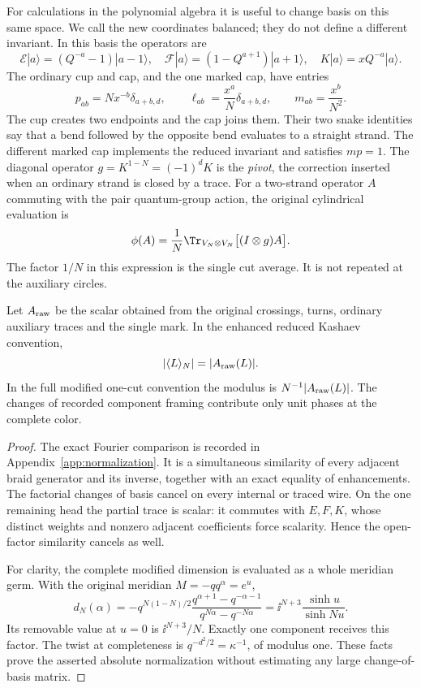 For calculations in the polynomial algebra it is useful to change basis on this same space. We call the new coordinates balanced; they do not define a different invariant. In this basis the operators are
\begin{equation}\label{eq:balanced-module}
 \mathcal E|a\rangle=(Q^{-a}-1)|a-1\rangle,\quad
 \mathcal F|a\rangle=(1-Q^{a+1})|a+1\rangle,\quad
 K|a\rangle=xQ^{-a}|a\rangle.
\end{equation}
The ordinary cup and cap, and the one marked cap, have entries
\begin{equation}\label{eq:cups}
 p_{ab}=Nx^{-b}\delta_{a+b,d},\qquad
 \ell_{ab}=\frac{x^a}{N}\delta_{a+b,d},\qquad
 m_{ab}=\frac{x^b}{N^2}.
\end{equation}
The cup creates two endpoints and the cap joins them. Their two snake identities say that a bend followed by the opposite bend evaluates to a straight strand. The different marked cap implements the reduced invariant and satisfies $mp=1$. The diagonal operator $g=K^{1-N}=(-1)^dK$ is the \emph{pivot}, the correction inserted when an ordinary strand is closed by a trace. For a two-strand operator $A$ commuting with the pair quantum-group action, the original cylindrical evaluation is
\begin{equation}\label{eq:phi-physical}
 \phi(A)=\frac1N\Tr_{V_N\otimes V_N}\bigl[(I\otimes g)A\bigr].
\end{equation}
The factor $1/N$ in this expression is the single cut average. It is not repeated at the auxiliary circles.

\begin{proposition}[Normalization]\label{prop:normalization}
Let $A_{\rm raw}$ be the scalar obtained from the original crossings, turns, ordinary auxiliary traces and the single mark. In the enhanced reduced Kashaev convention,
\[
 |\langle L\rangle_N|=|A_{\rm raw}(L)|.
\]
In the full modified one-cut convention the modulus is $N^{-1}|A_{\rm raw}(L)|$. The changes of recorded component framing contribute only unit phases at the complete color.
\end{proposition}
\begin{proof}
The exact Fourier comparison is recorded in Appendix~\ref{app:normalization}. It is a simultaneous similarity of every adjacent braid generator and its inverse, together with an exact equality of enhancements. The factorial changes of basis cancel on every internal or traced wire. On the one remaining head the partial trace is scalar: it commutes with $E,F,K$, whose distinct weights and nonzero adjacent coefficients force scalarity. Hence the open-factor similarity cancels as well.

For clarity, the complete modified dimension is evaluated as a whole meridian germ. With the original meridian $M=-q q^\alpha=e^u$,
\[
 d_N(\alpha)=-q^{N(1-N)/2}
 \frac{q^{\alpha+1}-q^{-\alpha-1}}{q^{N\alpha}-q^{-N\alpha}}
 =\ii^{N+3}\frac{\sinh u}{\sinh Nu}.
\]
Its removable value at $u=0$ is $\ii^{N+3}/N$. Exactly one component receives this factor. The twist at completeness is $q^{-d^2/2}=\kappa^{-1}$, of modulus one. These facts prove the asserted absolute normalization without estimating any large change-of-basis matrix.
\end{proof}

